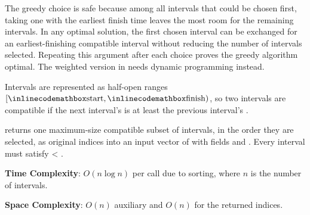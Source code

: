 The greedy choice is safe because among all intervals that could be chosen first, taking one with the earliest finish time leaves the most room for the remaining intervals. In any optimal solution, the first chosen interval can be exchanged for an earliest-finishing compatible interval without reducing the number of intervals selected. Repeating this argument after each choice proves the greedy algorithm optimal. The weighted version in  needs dynamic programming instead.

Intervals are represented as half-open ranges $[{\inlinecodemath{start}}, {\inlinecodemath{finish}})$, so two intervals are compatible if the next interval's  is at least the previous interval's .

\begin{compactitem}
  \item {} returns one maximum-size compatible subset of intervals, in the order they are selected, as original indices into an input vector of  with fields  and . Every interval must satisfy  \textless{} .
\end{compactitem}

\textbf{Time Complexity}: $O(n \log n)$ per call due to sorting, where $n$ is the number of intervals.

\textbf{Space Complexity}: $O(n)$ auxiliary and $O(n)$ for the returned indices.

